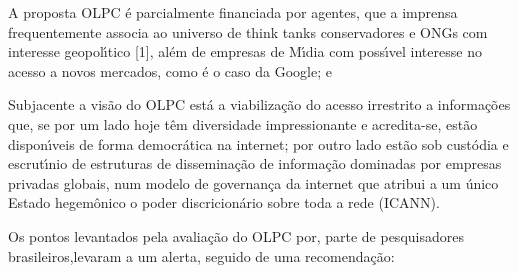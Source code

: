 \documentclass[
12pt,		%
openright,	%
twoside,  %
a4paper,			%
chapter=TITLE,		%
english,			%
french,				%
spanish,			%
brazil				%
]{USPSC-classe/USPSC}
\begin{document}
\begin{alineas}
\item \textquotedbl A proposta OLPC \'e parcialmente financiada por agentes, que a imprensa frequentemente associa ao universo de think tanks conservadores e ONGs com interesse geopol\'{\i}tico [1], al\'em de empresas de M\'{\i}dia com poss\'{\i}vel interesse no acesso a novos mercados, como \'e o caso da Google; e
\item \textquotedbl Subjacente a vis\~ao do OLPC est\'a a viabiliza\c{c}\~ao do acesso irrestrito a informa\c{c}\~oes que, se por um lado hoje t\^em diversidade impressionante e acredita-se, est\~ao dispon\'{\i}veis de forma democr\'atica na internet; por outro lado est\~ao sob cust\'odia e escrut\'{\i}nio de estruturas de dissemina\c{c}\~ao de informa\c{c}\~ao dominadas por empresas privadas globais, num modelo de governan\c{c}a da internet que atribui a um \'unico Estado hegem\^onico o poder discricion\'ario sobre toda a rede (ICANN).\textquotedbl 
\end{alineas}

Os pontos levantados pela avalia\c{c}\~ao do OLPC por, parte de pesquisadores brasileiros,levaram a um alerta, seguido de uma recomenda\c{c}\~ao:


















\noindent\begin{center}\mbox{\centering{}}\end{center}
\end{document}
